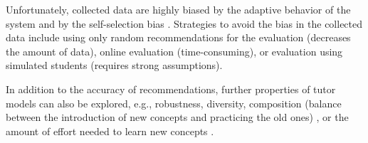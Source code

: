 Unfortunately, collected data are highly biased by the
adaptive behavior of the system and by the self-selection bias \cite{data-collection-bias}.
Strategies to avoid the bias in the collected data include
using only random recommendations for the evaluation (decreases the amount of data),
online evaluation (time-consuming),
or evaluation using simulated students (requires strong assumptions).


In addition to the accuracy of recommendations, %
further properties of tutor models can also be explored,
e.g., robustness, diversity, %
composition (balance between the introduction of new concepts and practicing the old ones)
\cite{progression-analysis},  %
or the amount of effort needed to learn new concepts \cite{evaluation-leopard}.  %




